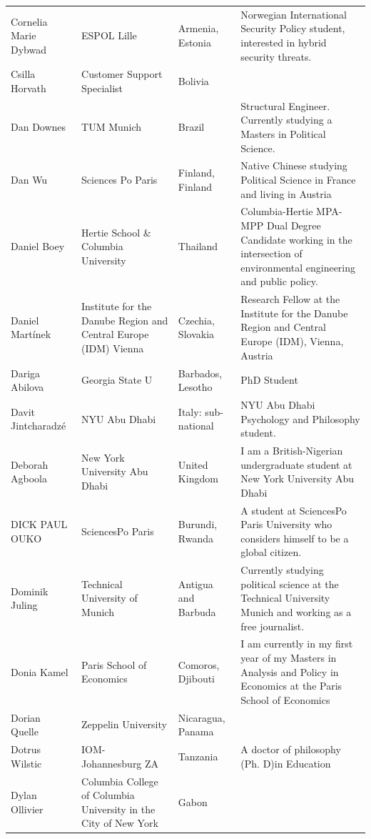 \documentclass[]{article}
\begin{document}
\begin{longtable}{l>{\raggedright\arraybackslash}p{2cm}>{\raggedright\arraybackslash}p{2cm}>{\raggedright\arraybackslash}p{3cm}}
Cornelia Marie Dybwad & ESPOL Lille & Armenia, Estonia & Norwegian International Security Policy student, interested in hybrid security threats.\\
\rowcolor{gray!6}  Csilla Horvath & Customer Support Specialist & Bolivia & \\
Dan Downes & TUM Munich & Brazil & Structural Engineer. Currently studying a Masters in Political Science.\\
\addlinespace
\rowcolor{gray!6}  Dan Wu & Sciences Po Paris & Finland, Finland & Native Chinese studying Political Science in France and living in Austria\\
Daniel Boey & Hertie School \& Columbia University & Thailand & Columbia-Hertie MPA-MPP Dual Degree Candidate working in the intersection of environmental engineering and public policy.\\
\rowcolor{gray!6}  Daniel Martínek & Institute for the Danube Region and Central Europe (IDM) Vienna & Czechia, Slovakia & Research Fellow at the Institute for the Danube Region and Central Europe (IDM), Vienna, Austria\\
Dariga Abilova & Georgia State U & Barbados, Lesotho & PhD Student\\
\rowcolor{gray!6}  Davit Jintcharadzé & NYU Abu Dhabi & Italy: sub-national & NYU Abu Dhabi Psychology and Philosophy student.\\
\addlinespace
Deborah Agboola & New York University Abu Dhabi & United Kingdom & I am a British-Nigerian undergraduate student at New York University Abu Dhabi\\
\rowcolor{gray!6}  DICK PAUL OUKO & SciencesPo Paris & Burundi, Rwanda & A student at SciencesPo Paris University who considers himself to be a global citizen.\\
Dominik Juling & Technical University of Munich & Antigua and Barbuda & Currently studying political science at the Technical University Munich and working as a free journalist.\\
\rowcolor{gray!6}  Donia Kamel & Paris School of Economics & Comoros, Djibouti & I am currently in my first year of my Masters in Analysis and Policy in Economics at the Paris School of Economics\\
Dorian Quelle & Zeppelin University & Nicaragua, Panama & \\
\addlinespace
\rowcolor{gray!6}  Dotrus Wilstic & IOM- Johannesburg ZA & Tanzania & A doctor of philosophy (Ph. D)in Education\\
Dylan Ollivier & Columbia College of Columbia University in the City of New York & Gabon & \\

\end{longtable}
\end{document}
